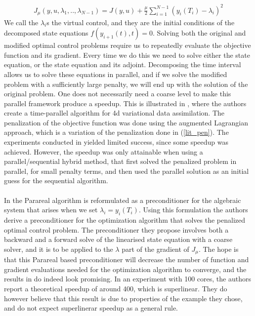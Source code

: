 \begin{align}
J_{\mu}(y,u,\lambda_1,..,\lambda_{N-1})=J(y,u) +\frac{\mu }{2}\sum_{i=1}^{N-1}(y_i(T_i)-\lambda_i)^2 \label{lit_pen}
\end{align} 
We call the $\lambda_i$s the virtual control, and they are the initial conditions of the decomposed state equations $f(y_{i+1}(t),t)=0$. Solving both the original and modified optimal control problems require us to repeatedly evaluate the objective function and its gradient. Every time we do this we need to solve either the state equation, or the state equation and its adjoint. Decomposing the time interval allows us to solve these equations in parallel, and if we solve the modified problem with a sufficiently large penalty, we will end up with the solution of the original problem. One does not necessarily need a coarse level to make this parallel framework produce a speedup. This is illustrated in \cite{rao2016time}, where the authors create a time-parallel algorithm for 4d variational data assimilation. The penalization of the objective function was done using the augmented Lagrangian approach, which is a variation of the penalization done in (\ref{lit_pen}). The experiments conducted in \cite{rao2016time} yielded limited success, since some speedup was achieved. However, the speedup was only attainable when using a parallel/sequential hybrid method, that first solved the penalized problem in parallel, for small penalty terms, and then used the parallel solution as an initial guess for the sequential algorithm. 
\\
\\
In \cite{maday2002parareal} the Parareal algorithm is reformulated as a preconditioner for the algebraic system that arises when we set $\lambda_i=y_{i}(T_i)$. Using this formulation the authors derive a preconditioner for the optimization algorithm that solves the penalized optimal control problem. The preconditioner they propose involves both a backward and a forward solve of the linearised state equation with a coarse solver, and it is to be applied to the $\lambda$ part of the gradient of $J_{\mu}$. The hope is that this Parareal based preconditioner will decrease the number of function and gradient evaluations needed for the optimization algorithm to converge, and the results in \cite{maday2002parareal} do indeed look promising. In an experiment with 100 cores, the authors report a theoretical speedup of around 400, which is superlinear. They do however believe that this result is due to properties of the example they chose, and do not expect superlinerar speedup as a general rule. 
